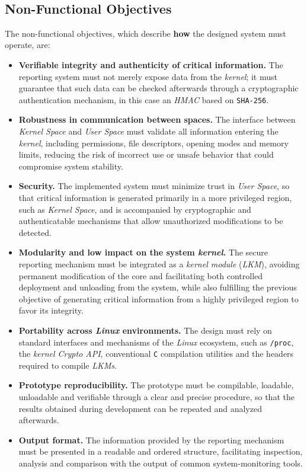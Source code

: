 \

\subsection{Non-Functional Objectives}
\label{sec:onf}

The non-functional objectives, which describe \textbf{how} the designed system must operate, are:

\begin{itemize}
    \item \textbf{Verifiable integrity and authenticity of critical information.} The reporting system must not merely expose data from the \textit{kernel}; it must guarantee that such data can be checked afterwards through a cryptographic authentication mechanism, in this case an \textit{HMAC} based on \texttt{SHA-256}.
    \item \textbf{Robustness in communication between spaces.} The interface between \textit{Kernel Space} and \textit{User Space} must validate all information entering the \textit{kernel}, including permissions, file descriptors, opening modes and memory limits, reducing the risk of incorrect use or unsafe behavior that could compromise system stability.
    \item \textbf{Security.} The implemented system must minimize trust in \textit{User Space}, so that critical information is generated primarily in a more privileged region, such as \textit{Kernel Space}, and is accompanied by cryptographic and authenticatable mechanisms that allow unauthorized modifications to be detected.
    \item \textbf{Modularity and low impact on the system \textit{kernel}.} The secure reporting mechanism must be integrated as a \textit{kernel module} (\textit{LKM}), avoiding permanent modification of the core and facilitating both controlled deployment and unloading from the system, while also fulfilling the previous objective of generating critical information from a highly privileged region to favor its integrity.
    \item \textbf{Portability across \textit{Linux} environments.} The design must rely on standard interfaces and mechanisms of the \textit{Linux} ecosystem, such as \texttt{/proc}, the \textit{kernel Crypto API}, conventional \texttt{C} compilation utilities and the headers required to compile \textit{LKMs}.
    \item \textbf{Prototype reproducibility.} The prototype must be compilable, loadable, unloadable and verifiable through a clear and precise procedure, so that the results obtained during development can be repeated and analyzed afterwards.
    \item \textbf{Output format.} The information provided by the reporting mechanism must be presented in a readable and ordered structure, facilitating inspection, analysis and comparison with the output of common system-monitoring tools.
\end{itemize}

